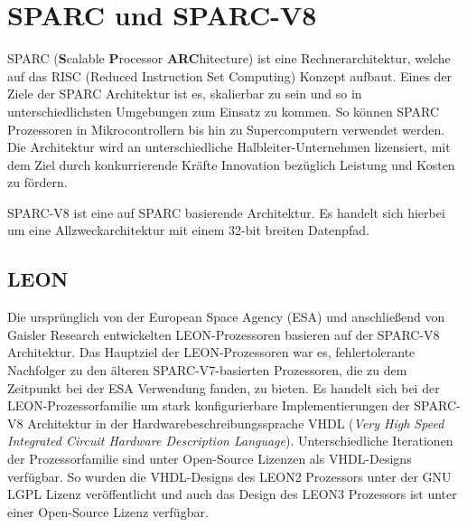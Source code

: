 



\section{SPARC und SPARC-V8}

SPARC (\textbf{S}calable \textbf{P}rocessor \textbf{ARC}hitecture) ist eine Rechnerarchitektur, welche auf das
RISC (Reduced Instruction Set Computing) Konzept aufbaut. Eines der Ziele der SPARC Architektur ist es, skalierbar
zu sein und so in unterschiedlichsten Umgebungen zum Einsatz zu kommen. So können SPARC Prozessoren in
Mikrocontrollern bis hin zu Supercomputern verwendet werden. Die Architektur wird an unterschiedliche
Halbleiter-Unternehmen lizensiert, mit dem Ziel durch konkurrierende Kräfte Innovation bezüglich Leistung und
Kosten zu fördern.\cite{sparc}

SPARC-V8 ist eine auf SPARC basierende Architektur. Es handelt sich hierbei um eine Allzweckarchitektur mit einem
32-bit breiten Datenpfad.\cite{sparcv8Eval}

\subsection{LEON}

Die ursprünglich von der European Space Agency (ESA) und anschließend von Gaisler Research entwickelten
LEON-Prozessoren basieren auf der SPARC-V8 Architektur.
Das Hauptziel der LEON-Prozessoren war es, fehlertolerante Nachfolger zu den älteren SPARC-V7-basierten
Prozessoren, die zu dem Zeitpunkt bei der ESA Verwendung fanden, zu bieten.\cite{gaislerLeon}
Es handelt sich bei der LEON-Prozessorfamilie um stark konfigurierbare
Implementierungen der SPARC-V8 Architektur in der Hardwarebeschreibungssprache
VHDL (\textit{Very High Speed Integrated Circuit Hardware Description Language}).
Unterschiedliche Iterationen der Prozessorfamilie sind unter Open-Source Lizenzen als VHDL-Designs verfügbar.
So wurden die VHDL-Designs des LEON2 Prozessors unter der GNU LGPL Lizenz veröffentlicht\cite{sparcv8Eval} und
auch das Design des LEON3 Prozessors ist unter einer Open-Source Lizenz verfügbar\cite{invasiveArrays}.

